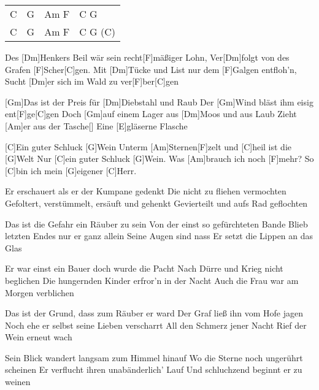 

\begin{guitar}
	 {\footnotesize\begin{tabular}{l|l|l|l}
			C & G & Am F & C G \\
			C & G & Am F & C G (C) 
	\end{tabular}}

	Des [Dm]Henkers Beil wär sein recht[F]mäßiger Lohn,
	Ver[Dm]folgt von des Grafen [F]Scher[C]gen.
	Mit [Dm]Tücke und List nur dem [F]Galgen entfloh'n,
	Sucht [Dm]er sich im Wald zu ver[F]ber[C]gen
	
	[Gm]Das ist der Preis für [Dm]Diebstahl und Raub
	Der [Gm]Wind bläst ihm eisig ent[F]ge[C]gen
	Doch [Gm]auf einem Lager aus [Dm]Moos und aus Laub
	Zieht [Am]er aus der Tasche[]{}
	Eine [E]gläserne Flasche
	
	[C]Ein guter Schluck [G]Wein
	Unterm [Am]Sternen[F]zelt und [C]heil ist die [G]Welt
	Nur [C]ein guter Schluck [G]Wein.
	Was [Am]brauch ich noch [F]mehr? So [C]bin ich mein [G]eigener [C]Herr.

	Er erschauert als er der Kumpane gedenkt
	Die nicht zu fliehen vermochten
	Gefoltert, verstümmelt, ersäuft und gehenkt
	Gevierteilt und aufs Rad geflochten

	Das ist die Gefahr ein Räuber zu sein
	Von der einst so gefürchteten Bande
	Blieb letzten Endes nur er ganz allein
	Seine Augen sind nass
	Er setzt die Lippen an das Glas
	
	 
	
	\pagebreak
	Er war einst ein Bauer doch wurde die Pacht
	Nach Dürre und Krieg nicht beglichen
	Die hungernden Kinder erfror'n in der Nacht
	Auch die Frau war am Morgen verblichen

	Das ist der Grund, dass zum Räuber er ward
	Der Graf ließ ihn vom Hofe jagen
	Noch ehe er selbst seine Lieben verscharrt
	All den Schmerz jener Nacht
	Rief der Wein erneut wach
	
	 

	Sein Blick wandert langsam zum Himmel hinauf
	Wo die Sterne noch ungerührt scheinen
	Er verflucht ihren unabänderlich' Lauf
	Und schluchzend beginnt er zu weinen
	

\end{guitar}
